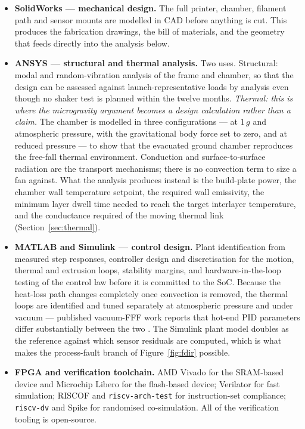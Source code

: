 \documentclass[11pt,a4paper]{article}
\begin{document}
\begin{itemize}
  \item \textbf{SolidWorks --- mechanical design.} The full printer, chamber,
        filament path and sensor mounts are modelled in CAD before anything is
        cut. This produces the fabrication drawings, the bill of materials, and
        the geometry that feeds directly into the analysis below.
  \item \textbf{ANSYS --- structural and thermal analysis.} Two uses. Structural:
        modal and random-vibration analysis of the frame and chamber, so that the
        design can be assessed against launch-representative loads by analysis
        even though no shaker test is planned within the twelve months.
        \emph{Thermal: this is where the microgravity argument becomes a design
        calculation rather than a claim.} The chamber is modelled in three
        configurations --- at \(1\,g\) and atmospheric pressure, with the
        gravitational body force set to zero, and at reduced pressure --- to show
        that the evacuated ground chamber reproduces the free-fall thermal
        environment. Conduction and surface-to-surface radiation are the transport
        mechanisms; there is no convection term to size a fan against. What the
        analysis produces instead is the build-plate power, the chamber wall
        temperature setpoint, the required wall emissivity, the minimum layer dwell
        time needed to reach the target interlayer temperature, and the
        conductance required of the moving thermal link
        (Section~\ref{sec:thermal}).
  \item \textbf{MATLAB and Simulink --- control design.} Plant identification
        from measured step responses, controller design and discretisation for
        the motion, thermal and extrusion loops, stability margins, and
        hardware-in-the-loop testing of the control law before it is committed to
        the SoC. Because the heat-loss path changes completely once convection
        is removed, the thermal loops are identified and tuned separately at
        atmospheric pressure and under vacuum --- published vacuum-FFF work
        reports that hot-end PID parameters differ substantially between the two
        \cite{scirep2025vacuumfff}. The Simulink plant model doubles as the
        reference against which sensor residuals are computed, which is what
        makes the process-fault branch of Figure~\ref{fig:fdir} possible.
  \item \textbf{FPGA and verification toolchain.} AMD Vivado for the SRAM-based
        device and Microchip Libero for the flash-based device; Verilator for
        fast simulation; RISCOF and \texttt{riscv-arch-test} for instruction-set
        compliance; \texttt{riscv-dv} and Spike for randomised
        co-simulation. All of the verification tooling is open-source.
\end{itemize}
\end{document}

